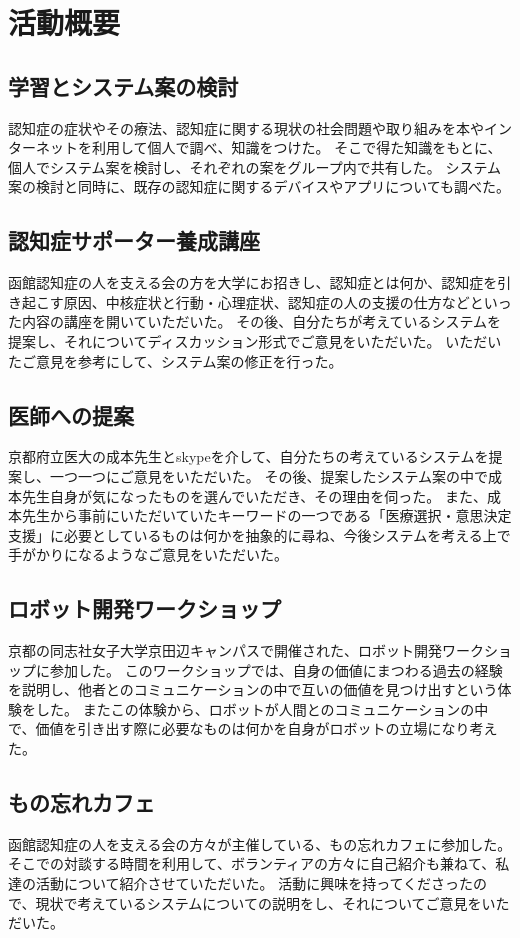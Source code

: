 \documentclass[../report]{subfiles}
\begin{document}
\section{活動概要}
\subsection{学習とシステム案の検討}\label{sec:kentou}
認知症の症状やその療法、認知症に関する現状の社会問題や取り組みを本やインターネットを利用して個人で調べ、知識をつけた。
そこで得た知識をもとに、個人でシステム案を検討し、それぞれの案をグループ内で共有した。
システム案の検討と同時に、既存の認知症に関するデバイスやアプリについても調べた。

\subsection{認知症サポーター養成講座}
函館認知症の人を支える会の方を大学にお招きし、認知症とは何か、認知症を引き起こす原因、中核症状と行動・心理症状、認知症の人の支援の仕方などといった内容の講座を開いていただいた。
その後、自分たちが考えているシステムを提案し、それについてディスカッション形式でご意見をいただいた。
いただいたご意見を参考にして、システム案の修正を行った。

\subsection{医師への提案}
京都府立医大の成本先生とskypeを介して、自分たちの考えているシステムを提案し、一つ一つにご意見をいただいた。
その後、提案したシステム案の中で成本先生自身が気になったものを選んでいただき、その理由を伺った。
また、成本先生から事前にいただいていたキーワードの一つである「医療選択・意思決定支援」に必要としているものは何かを抽象的に尋ね、今後システムを考える上で手がかりになるようなご意見をいただいた。

\subsection{ロボット開発ワークショップ}
京都の同志社女子大学京田辺キャンパスで開催された、ロボット開発ワークショップに参加した。
このワークショップでは、自身の価値にまつわる過去の経験を説明し、他者とのコミュニケーションの中で互いの価値を見つけ出すという体験をした。
またこの体験から、ロボットが人間とのコミュニケーションの中で、価値を引き出す際に必要なものは何かを自身がロボットの立場になり考えた。

\subsection{もの忘れカフェ}
函館認知症の人を支える会の方々が主催している、もの忘れカフェに参加した。
そこでの対談する時間を利用して、ボランティアの方々に自己紹介も兼ねて、私達の活動について紹介させていただいた。
活動に興味を持ってくださったので、現状で考えているシステムについての説明をし、それについてご意見をいただいた。
\end{document}
